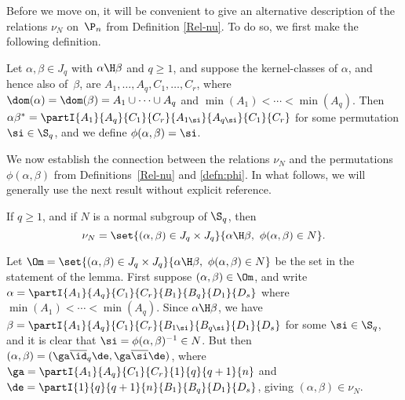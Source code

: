 Before we move on, it will be convenient to give an alternative description of the relations $\nu_N$ on~$\P_n$ from Definition \ref{Rel-nu}.  To do so, we first make the following definition.

\begin{defn}\label{defn:phi}
Let $\alpha,\beta\in J_q$ with $\alpha\H\beta$ and $q\geq1$, and suppose the kernel-classes of $\alpha$, and hence also of~$\beta$, are $A_1,\ldots,A_q,C_1,\ldots,C_r$, where $\dom(\alpha)=\dom(\beta)=A_1\cup\cdots\cup A_q$ and $\min(A_1)<\cdots<\min(A_q)$.  Then
$\alpha\beta^* = \partI{A_1}{A_q}{C_1}{C_r}{A_{1\si}}{A_{q\si}}{C_1}{C_r}$ for some permutation $\si\in\S_q$, and we define $\phi(\alpha,\beta)=\si$.  
\end{defn}

We now establish the connection between the relations $\nu_N$ and the permutations $\phi(\alpha,\beta)$ from Definitions~\ref{Rel-nu} and \ref{defn:phi}.  In what follows, we will generally use the next result without explicit reference.

\begin{lemma}\label{lem:nu_phi}
If $q\geq1$, and if $N$ is a normal subgroup of $\S_q$, then
\[
\nu_N=\set{ (\alpha,\beta)\in J_q\times J_q}{\alpha\H \beta,\ \phi(\alpha,\beta)\in N}.
\]
\end{lemma}

\pf Let $\Om=\set{ (\alpha,\beta)\in J_q\times J_q}{\alpha\H \beta,\
\phi(\alpha,\beta)\in N}$ be the set in the statement of the lemma.  First
suppose $(\alpha,\beta)\in\Om$, and write $\alpha=\partI{A_1}{A_q}{C_1}{C_r}{B_1}{B_q}{D_1}{D_s}$ where $\min(A_1)<\cdots<\min(A_q)$.  Since $\alpha\H\beta$, we have $\beta=\partI{A_1}{A_q}{C_1}{C_r}{B_{1\si}}{B_{q\si}}{D_1}{D_s}$ for some $\si\in\S_q$, and it is clear that $\si=\phi(\alpha,\beta)^{-1}\in N$.  But then $(\alpha,\beta)=(\ga\overline{\id}_q\de,\ga\overline{\si}\de)$, where $\ga=\partI{A_1}{A_q}{C_1}{C_r}{1}{q}{q+1}{n}$ and $\de=\partI{1}{q}{q+1}{n}{B_1}{B_q}{D_1}{D_s}$, giving $(\alpha,\beta)\in\nu_N$.

